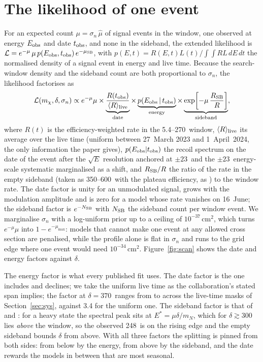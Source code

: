 \documentclass[11pt]{article}
\newcommand{\keV}{\,\mathrm{keV}\xspace}
\begin{document}
\section{The likelihood of one event}
For an expected count $\mu=\sigma_n\,\hat\mu$ of signal events in the window, one
observed at energy $E_{\rm obs}$ and date $t_{\rm obs}$, and none in the sideband, the
extended likelihood is
$\mathcal L=e^{-\mu}\,\mu\,p(E_{\rm obs},t_{\rm obs})\,e^{-\mu_{\rm SB}}$, with
$p(E,t)=R(E,t)L(t)/\int\!\!\int R L\,dE\,dt$ the normalised density of a signal event in
energy and live time.  Because the search-window density and the sideband count are
both proportional to $\sigma_n$, the likelihood factorises as
\begin{equation}
  \mathcal L(m_\chi,\delta,\sigma_n)\propto e^{-\mu}\mu\times
  \underbrace{\frac{R(t_{\rm obs})}{\langle R\rangle_{\rm live}}}_{\text{date}}\times
  \underbrace{p(E_{\rm obs}\,|\,t_{\rm obs})}_{\text{energy}}\times
  \underbrace{\exp\!\left[-\mu\,\frac{R_{\rm SB}}{R}\right]}_{\text{sideband}},
  \label{eq:like}
\end{equation}
where $R(t)$ is the efficiency-weighted rate in the 5.4--270\keV window,
$\langle R\rangle_{\rm live}$ its average over the live time (uniform between 27~March
2023 and 1~April~2024, the only information the paper gives), $p(E_{\rm obs}|t_{\rm obs})$
the recoil spectrum on the date of the event after the $\sqrt E$ resolution anchored at
$\pm23$\keV and the $\pm23$\keV energy-scale systematic marginalised as a shift, and
$R_{\rm SB}/R$ the ratio of the rate in the empty sideband (taken as 350--600\keV with
the plateau efficiency, as \citealt{HiggsinoSideband2026}) to the window rate.  The date
factor is unity for an unmodulated signal, grows with the modulation amplitude and is
zero for a model whose rate vanishes on 16~June; the sideband factor is
$e^{-N_{\rm SB}}$ with $N_{\rm SB}$ the sideband count per window event.  We marginalise
$\sigma_n$ with a log-uniform prior up to a ceiling of $10^{-37}$\,cm$^2$, which turns
$e^{-\mu}\mu$ into $1-e^{-\mu_{\max}}$: models that cannot make one event at any allowed
cross section are penalised, while the profile alone is flat in $\sigma_n$ and runs to
the grid edge where one event would need $10^{-34}$\,cm$^2$.  Figure~\ref{fig:scan}
shows the date and energy factors against $\delta$.

The energy factor is what every published fit uses.  The date factor is the one
\citet{McCabe2026seasonal} includes and \citet{DiMauro2026edge} declines; we take the
uniform live time as the collaboration's stated span implies; the factor at
$\delta=370$\keV ranges from \TimingMaskMin to \TimingMaskMax across the live-time
masks of Section~\ref{sec:sys}, against 3.4 for the uniform one.  The sideband factor is that of
\citet{HiggsinoSideband2026} and \citet{DentNewstead2026}: for a heavy state the
spectral peak sits at $E^\ast=\mu\delta/m_N$, which for $\delta\gtrsim300$\keV lies
\emph{above} the window, so the observed 248\keV is on the rising edge and the empty
sideband bounds $\delta$ from above.  With all three factors the splitting is pinned
from both sides: from below by the energy, from above by the sideband, and the date
rewards the models in between that are most seasonal.
\end{document}
